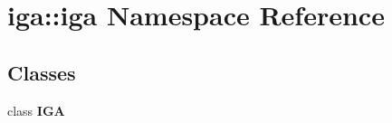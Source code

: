 \section{iga::iga Namespace Reference}
\label{namespaceiga_1_1iga}


\subsection*{Classes}
\begin{CompactItemize}
\item 
class {\bf IGA}
\end{CompactItemize}
